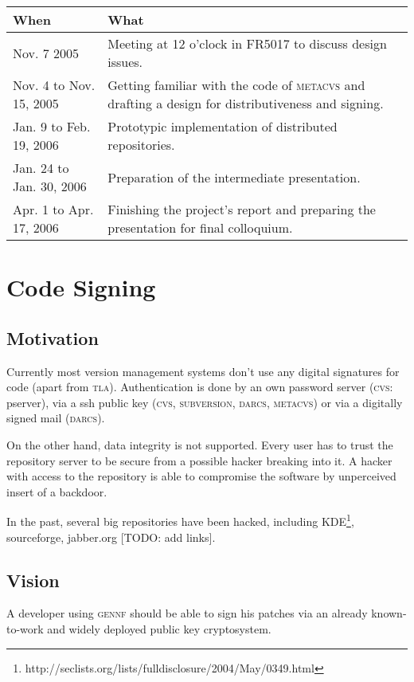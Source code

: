 \documentclass[fleqn, 10pt, a4paper]{article}
\begin{document}
\begin{tabular}{|p{}|p{}|}
\hline
\textmd{When} & \textmd{What} \\
\hline\hline
Nov. 7 2005 &
Meeting at 12 o'clock in FR5017 to discuss design issues. \\
\hline
Nov. 4 to Nov. 15, 2005 &
Getting familiar with the code of \textsc{metacvs}
and drafting a design for distributiveness and signing. \\
\hline
Jan. 9 to Feb. 19, 2006 & Prototypic implementation of
distributed repositories. \\
\hline
Jan. 24 to Jan. 30, 2006 & Preparation of the intermediate
presentation. \\
\hline
Apr. 1 to Apr. 17, 2006 & Finishing the project's report
and preparing the presentation for final colloquium. \\
\hline
\end{tabular}

\section{Code Signing}

\subsection{Motivation}
Currently most version management systems don't use any digital signatures
for code (apart from \textsc{tla}). Authentication is done by an own password
server (\textsc{cvs}: pserver), via a ssh public key (\textsc{cvs},
\textsc{subversion}, \textsc{darcs}, \textsc{metacvs}) or
via a digitally signed mail (\textsc{darcs}).

On the other hand, data integrity is not supported.
Every user has to trust the repository server
to be secure from a possible hacker breaking into it.
A hacker with access to the repository is able to compromise the
software by unperceived insert of a backdoor.

In the past, several big repositories have been hacked, including
KDE\footnote{http://seclists.org/lists/fulldisclosure/2004/May/0349.html},
sourceforge, jabber.org [TODO: add links].


\subsection{Vision}
A developer using \textsc{gennf} should be able to sign his patches via
an already known-to-work and widely deployed public key cryptosystem.
\end{document}
